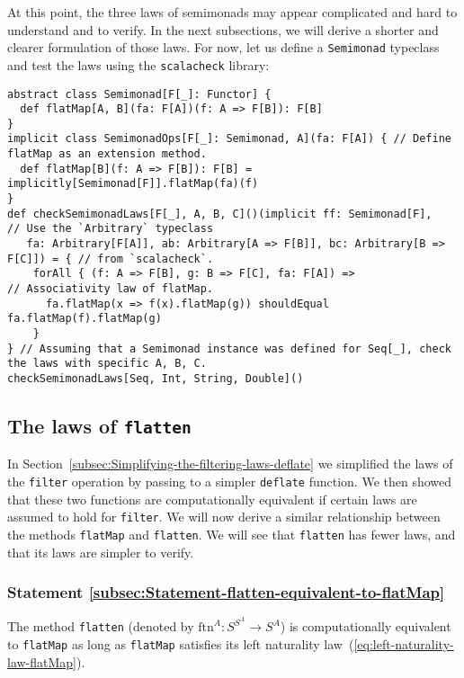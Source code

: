 At this point, the three laws of semimonads may appear complicated
and hard to understand and to verify. In the next subsections, we
will derive a shorter and clearer formulation of those laws. For now,
let us define a \lstinline!Semimonad! typeclass
and test the laws using the \texttt{scalacheck} library:
\begin{lstlisting}
abstract class Semimonad[F[_]: Functor] {
  def flatMap[A, B](fa: F[A])(f: A => F[B]): F[B]
}
implicit class SemimonadOps[F[_]: Semimonad, A](fa: F[A]) { // Define flatMap as an extension method.
  def flatMap[B](f: A => F[B]): F[B] = implicitly[Semimonad[F]].flatMap(fa)(f)
}
def checkSemimonadLaws[F[_], A, B, C]()(implicit ff: Semimonad[F],   // Use the `Arbitrary` typeclass
   fa: Arbitrary[F[A]], ab: Arbitrary[A => F[B]], bc: Arbitrary[B => F[C]]) = { // from `scalacheck`.
    forAll { (f: A => F[B], g: B => F[C], fa: F[A]) =>               // Associativity law of flatMap.
      fa.flatMap(x => f(x).flatMap(g)) shouldEqual fa.flatMap(f).flatMap(g)
    }
} // Assuming that a Semimonad instance was defined for Seq[_], check the laws with specific A, B, C.
checkSemimonadLaws[Seq, Int, String, Double]()
\end{lstlisting}


\subsection{The laws of \texttt{flatten}}

In Section~\ref{subsec:Simplifying-the-filtering-laws-deflate} we
simplified the laws of the \lstinline!filter! operation by passing
to a simpler \lstinline!deflate! function. We then showed that these
two functions are computationally equivalent if certain laws are assumed
to hold for \lstinline!filter!. We will now derive a similar relationship
between the methods \lstinline!flatMap! and \lstinline!flatten!.
We will see that \lstinline!flatten! has fewer laws, and that its
laws are simpler to verify.

\subsubsection{Statement \label{subsec:Statement-flatten-equivalent-to-flatMap}\ref{subsec:Statement-flatten-equivalent-to-flatMap}}

The method \lstinline!flatten! (denoted by $\text{ftn}^{A}:S^{S^{A}}\rightarrow S^{A}$)
is computationally equivalent
to \lstinline!flatMap! as long as \lstinline!flatMap! satisfies
its left naturality law~(\ref{eq:left-naturality-law-flatMap}).

